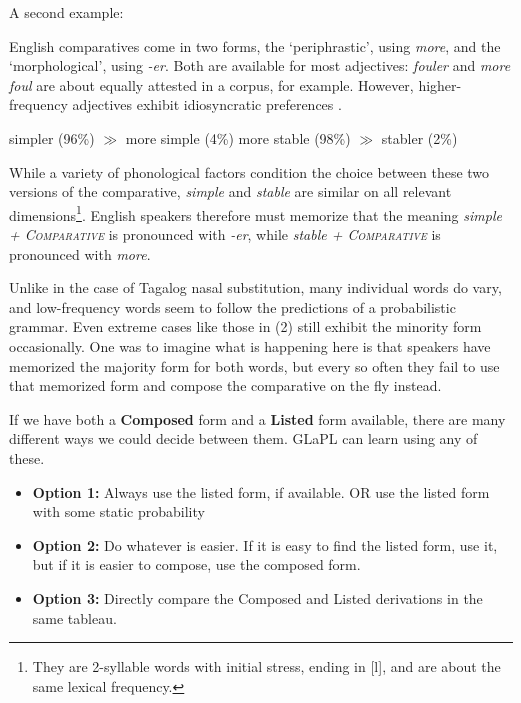 \documentclass[12]{article}
\begin{document}
		\hspace{2ex}
		
		A second example: 
		
		English comparatives come in two forms, the `periphrastic', using {\it more}, and the `morphological', using {\it -er}.  Both are available for most adjectives: {\it fouler} and {\it more foul} are about equally attested in a corpus, for example.  However, higher-frequency adjectives exhibit idiosyncratic preferences \citet{smithmoorecantwell17}.
		
		\begin{exe}
			\ex \begin{xlist}
				\ex simpler (96\%) $\gg$ more simple (4\%)
				\ex more stable (98\%) $\gg$ stabler (2\%)
			\end{xlist}
		\end{exe}
		
		While a variety of phonological factors condition the choice between these two versions of the comparative, {\it simple} and {\it stable} are similar on all relevant dimensions\footnote{They are 2-syllable words with initial stress, ending in [l], and are about the same lexical frequency.}.  English speakers therefore must memorize that the meaning {\it simple + \textsc{Comparative}} is pronounced with {\it -er}, while {\it stable + \textsc{Comparative}} is pronounced with {\it more}.
		
		Unlike in the case of Tagalog nasal substitution, many individual words do vary, and low-frequency words seem to follow the predictions of a probabilistic grammar.  Even extreme cases like those in (2) still exhibit the minority form occasionally.  One was to imagine what is happening here is that speakers have memorized the majority form for both words, but every so often they fail to use that memorized form and compose the comparative on the fly instead.
		
		\hspace{2ex}
		
		
		If we have both a {\bf Composed} form and a {\bf Listed} form available, there are many different ways we could decide between them.  GLaPL can learn using any of these.
		
		\begin{itemize}
			\item[] {\bf Option 1:} Always use the listed form, if available.  OR use the listed form with some static probability
			\item[] {\bf Option 2:} Do whatever is easier.  If it is easy to find the listed form, use it, but if it is easier to compose, use the composed form.
			\item[] {\bf Option 3:} Directly compare the Composed and Listed derivations in the same tableau.
		\end{itemize}
\end{document}

